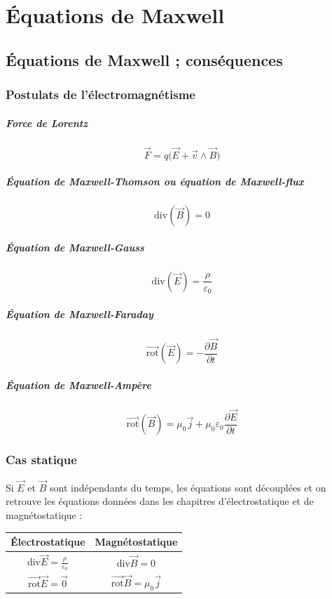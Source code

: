 \documentclass[french]{book}
\theoremstyle{plain}
\theoremstyle{definition}
\theoremstyle{remark}
\newcommand{\rot}{\overrightarrow{\text{rot}}}
\renewcommand{\div}{\text{div}}
\begin{document}
\chapter{Équations de Maxwell}
\localtableofcontents
\section{Équations de Maxwell ; conséquences}
\subsection{Postulats de l'électromagnétisme}
\paragraph{Force de Lorentz} $$\overrightarrow{F}=q\bigg(\overrightarrow{E}+\overrightarrow{v}\wedge\overrightarrow{B}\bigg)$$
\paragraph{Équation de Maxwell-Thomson ou équation de Maxwell-flux} $$\div\left(\overrightarrow{B}\right)=0$$
\paragraph{Équation de Maxwell-Gauss} $$\div\left(\overrightarrow{E}\right)=\frac{\rho}{\varepsilon_0}$$
\paragraph{Équation de Maxwell-Faraday} $$\rot\left(\overrightarrow{E}\right)=-\frac{\partial\overrightarrow{B}}{\partial t}$$
\paragraph{Équation de Maxwell-Ampère} $$\rot\left(\overrightarrow{B}\right)=\mu_0\overrightarrow{j}+\mu_0\varepsilon_0\frac{\partial\overrightarrow{E}}{\partial t}$$
\subsection{Cas statique}
Si $\overrightarrow{E}$ et $\overrightarrow{B}$ sont indépendants du temps, les équations sont découplées et on retrouve les équations données dans les chapitres d'électrostatique et de magnétostatique :
\begin{center}
	\begin{tabular}{|c|c|}
		\hline
		Électrostatique&Magnétostatique \\[3mm]
		\hline
		$\div\overrightarrow{E}=\frac{\rho}{\varepsilon_0}$&$\div\overrightarrow{B}=0$ \\[3mm]
		\hline
		$\rot\overrightarrow{E}=\overrightarrow{0}$&$\rot\overrightarrow{B}=\mu_0\overrightarrow{j}$ \\[3mm]
		\hline
	\end{tabular}
\end{center}
\end{document}
